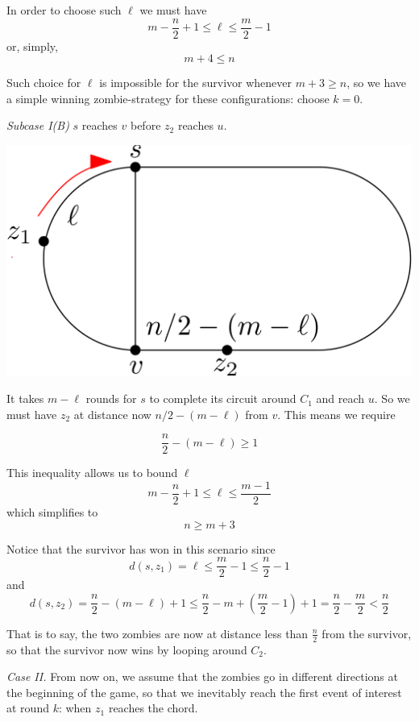 \documentclass[letterpaper, 10pt]{article}
\begin{document}
\begin{enumerate}
       In order to choose such $\ell$ we must have
       \[ m - \frac{n}{2} +1 \leq \ell \leq \frac{m}{2} -1 \]
       or, simply,
       \[ m + 4 \leq n \]

       Such choice for $\ell$ is impossible for the survivor whenever
       $m+3 \geq n$, so we have a simple winning zombie-strategy for these configurations:
       choose $k=0$.

       \emph{Subcase I(B)} $s$ reaches $v$ before $z_2$ reaches $u$.

       \begin{center}
        \includegraphics[scale=0.15]{diagramCaseIB_1}
       \end{center}

       It takes $m-\ell$ rounds for $s$ to complete its circuit around $C_1$ and reach $u$. So
       we must have $z_2$ at distance now $n/2 - (m-\ell)$ from $v$. This means we require

       \[ \frac{n}{2} - (m-\ell) \geq 1 \]

       This inequality allows us to bound $\ell$
       \[ m - \frac{n}{2} +1 \leq \ell \leq \frac{m-1}{2}\]
       which simplifies to
       \[ n \geq m+3 \]

       Notice that the survivor has won in this scenario since
       \[ d(s,z_1) = \ell \leq \frac{m}{2} -1 \leq \frac{n}{2} -1 \]
       and
       \[ d(s,z_2) = \frac{n}{2} - (m - \ell) + 1 \leq \frac{n}{2} - m + \left(\frac{m}{2} -1\right) +1 = \frac{n}{2} - \frac{m}{2} < \frac{n}{2} \]

       That is to say, the two zombies are now at distance less than $\frac{n}{2}$ from the survivor,
       so that the survivor now wins by looping around $C_2$.

       \emph{Case II.} From now on, we assume that the zombies go in different directions at the
       beginning of the game, so that we inevitably reach the first event of interest at round $k$:
       when $z_1$ reaches the chord.


\end{enumerate}
\end{document}
